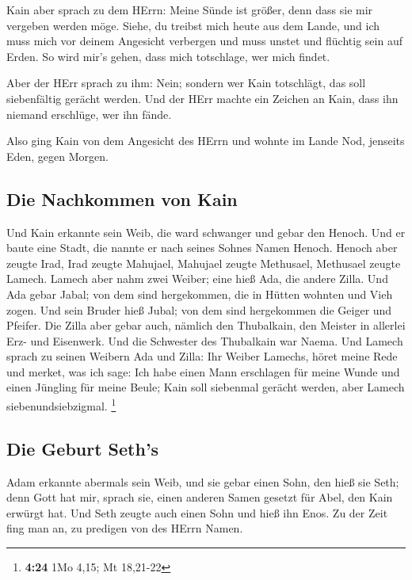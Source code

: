  Kain aber sprach zu dem HErrn: Meine Sünde ist größer,
denn dass sie mir vergeben werden möge.  Siehe, du
treibst mich heute aus dem Lande, und ich muss mich vor deinem Angesicht
verbergen und muss unstet und flüchtig sein auf Erden. So wird mir's
gehen, dass mich totschlage, wer mich findet.

 Aber der HErr sprach zu ihm: Nein; sondern wer Kain
totschlägt, das soll siebenfältig gerächt werden. Und der HErr machte
ein Zeichen an Kain, dass ihn niemand erschlüge, wer ihn fände.

 Also ging Kain von dem Angesicht des HErrn und wohnte im
Lande Nod, jenseits Eden, gegen Morgen.

\hypertarget{die-nachkommen-von-kain}{%
\subsection{Die Nachkommen von Kain}\label{die-nachkommen-von-kain}}

 Und Kain erkannte sein Weib, die ward schwanger und
gebar den Henoch. Und er baute eine Stadt, die nannte er nach seines
Sohnes Namen Henoch.  Henoch aber zeugte Irad, Irad
zeugte Mahujael, Mahujael zeugte Methusael, Methusael zeugte Lamech.
 Lamech aber nahm zwei Weiber; eine hieß Ada, die andere
Zilla.  Und Ada gebar Jabal; von dem sind hergekommen,
die in Hütten wohnten und Vieh zogen.  Und sein Bruder
hieß Jubal; von dem sind hergekommen die Geiger und Pfeifer.
 Die Zilla aber gebar auch, nämlich den Thubalkain, den
Meister in allerlei Erz- und Eisenwerk. Und die Schwester des Thubalkain
war Naema.  Und Lamech sprach zu seinen Weibern Ada und
Zilla: Ihr Weiber Lamechs, höret meine Rede und merket, was ich sage:
Ich habe einen Mann erschlagen für meine Wunde und einen Jüngling für
meine Beule;  Kain soll siebenmal gerächt werden, aber
Lamech siebenundsiebzigmal. \footnote{\textbf{4:24} 1Mo 4,15; Mt
  18,21-22}

\hypertarget{die-geburt-seths}{%
\subsection{Die Geburt Seth's}\label{die-geburt-seths}}

 Adam erkannte abermals sein Weib, und sie gebar einen
Sohn, den hieß sie Seth; denn Gott hat mir, sprach sie, einen anderen
Samen gesetzt für Abel, den Kain erwürgt hat.  Und Seth
zeugte auch einen Sohn und hieß ihn Enos. Zu der Zeit fing man an, zu
predigen von des HErrn Namen.

